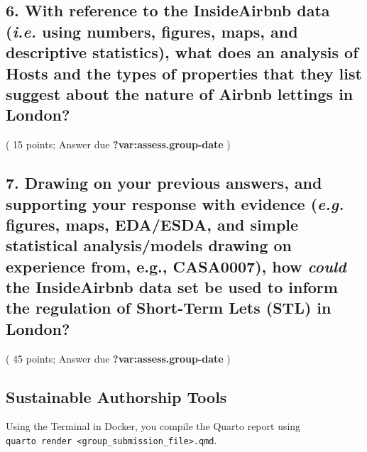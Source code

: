 \documentclass[
  a4paper,
  DIV=11,
  numbers=noendperiod]{scrartcl}
\begin{document}
\subsection{\texorpdfstring{6. With reference to the InsideAirbnb data
(\emph{i.e.} using numbers, figures, maps, and descriptive statistics),
what does an analysis of Hosts and the types of properties that they
list suggest about the nature of Airbnb lettings in
London?}{6. With reference to the InsideAirbnb data (i.e. using numbers, figures, maps, and descriptive statistics), what does an analysis of Hosts and the types of properties that they list suggest about the nature of Airbnb lettings in London?}}\label{with-reference-to-the-insideairbnb-data-i.e.-using-numbers-figures-maps-and-descriptive-statistics-what-does-an-analysis-of-hosts-and-the-types-of-properties-that-they-list-suggest-about-the-nature-of-airbnb-lettings-in-london}

( 15 points; Answer due \textbf{?var:assess.group-date} )

\subsection{\texorpdfstring{7. Drawing on your previous answers, and
supporting your response with evidence (\emph{e.g.} figures, maps,
EDA/ESDA, and simple statistical analysis/models drawing on experience
from, e.g., CASA0007), how \emph{could} the InsideAirbnb data set be
used to inform the regulation of Short-Term Lets (STL) in
London?}{7. Drawing on your previous answers, and supporting your response with evidence (e.g. figures, maps, EDA/ESDA, and simple statistical analysis/models drawing on experience from, e.g., CASA0007), how could the InsideAirbnb data set be used to inform the regulation of Short-Term Lets (STL) in London?}}\label{drawing-on-your-previous-answers-and-supporting-your-response-with-evidence-e.g.-figures-maps-edaesda-and-simple-statistical-analysismodels-drawing-on-experience-from-e.g.-casa0007-how-could-the-insideairbnb-data-set-be-used-to-inform-the-regulation-of-short-term-lets-stl-in-london}

( 45 points; Answer due \textbf{?var:assess.group-date} )

\subsection{Sustainable Authorship
Tools}\label{sustainable-authorship-tools}

Using the Terminal in Docker, you compile the Quarto report using
\texttt{quarto\ render\ \textless{}group\_submission\_file\textgreater{}.qmd}.
\end{document}
